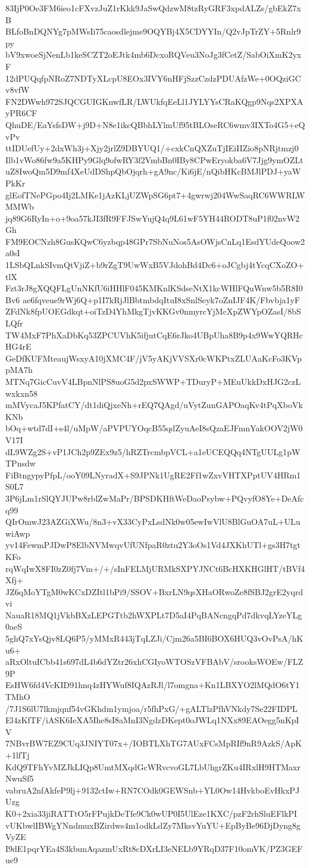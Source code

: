 83IjP0Oe3FM6ieo1cFXvzJuZ1rKkk9JaSwQdzwM8tzRyGRF3xpdALZs/gbEkZ7xB
BLfoBnDQNYg7pMWsIi75caosdlejme9OQYBj4X5CDYYIn/Q2vJpTrZY+5Rnlr9py
bV9xwoeSjNenLb1keSCZT2oEJtk4mb6DcxoRQVeu3NoJg3fCetZ/SabOiXmK2yxF
12dPUQqfpNRoZ7NDTyXLcpU8EOx3IVY6nHFjSzzCzdzPDUAfzWe+0OQziGCv8vfW
FN2DWwh972SJQCGUIGKnwfLR/LWUkfqEeLl1JYLYYsCRaKQgp9Nqs2XPXAyPR6CF
QhuDE/EaYsfsDW+j9D+N8e1ikcQBbhLYlmUf95tBLOseRC6wmv3IXTo4G5+eQvPv
ttIDUefUy+2dxWh3j+Xjy2jrlZ9DBYUQ1/+cxkCnQXZuTjIEiIIZio8pNRjtmzj0
Ilb1vWo86fw9a5KHPy9Glq9ofwRY3f2VmbBn0IBy8CPwEryokba6V7Jjg9ymOZLt
uZ8IwoQm5D9mf4XeUdDShpQbOjqrh+gA9nc/Ki6jE/nQibHKcBMJlPDJ+yaWPkKr
glEofTNePGpo4Ij2LMKe1jAzKLjUZWpSG6pt7+4gwrwj204WwSaqRC6WWRLWMMWb
jq89G6RyIn+o+9oa57kJI3fR9FFJSwYujQ4q9L61wF5YH44RODT8uP1f02nvW2Gh
FM9EOCNzh8GusKQwC6yzbqp48GPr7SbNuNos5AsOWjsCnLq1EsdYUdeQoow2a0sI
1LSbQLnkSIvmQtVjiZ+b9rZgT9UwWxB5VJdohBd4Dc6+oJCgbj4tYcqCXoZO+tlX
Fzt3rJ8gXQQFLgUnNKfU6iHHlF045KMKnlKSdseNtX1kcWHlFQuWnw5b5R8I0Bv6
ae6fqveue9rWj6Q+p1I7kRjJlBbtmbdqItuI8xSnlSeyk7oZnIJF4K/Fbvbja1yF
ZFdNk8fpUOEGdkqt+oiTzD4YhMkgTjvKKGv0nmyrcYjMcXpZWYpOZasI/8bSLQfr
TW4MxF7PhXaDbKq53ZPCUVhK5ifjutCqE6rJko4UBpUha8B9p4x9WwYQRHcHG4rE
GeDfKUFMteaujWsxyA10jXMC4F/jV5yAKjVVSXr0cWKPtxZLUAaKcFo3KVppMA7h
MTNq7GicCuvV4LBpnNlPS8uoG5d2pxSWWP+TDuryP+MEuUkkDxHJG2czLwxkxn58
mMVycaJ5KPfatCY/dt1diQjxeNh+rEQ7QAgd/uVytZunGAPOaqKv4tPqXboVkKNb
bOq+wtd7dI+s4l/uMpW/aPVPUYOqcB55qdZyuAeI8sQzaEJFmnYakOOV2jW0V17I
dL9WZg2S+vP1JCh2p9ZEx9z5/hRZTrcmbpVCL+a1eUCEQQq4NTgUULg1pWTPnsdw
FiBtngypyPfpL/ooY09LNyradX+S9JPNk1UgRE2Ff1wZxvVHTXPptUV4HRm1S0L7
3P6jLm1rSlQYJUPw8rblZwMaPr/BPSDKHftWeDaoPsybw+PQvyfO8Ye+DeAfcq99
QIrOmwJ23AZGiXWu/8n3+vX33CyPxLsdNk0w05ewIwVlU8BlGuOA7uL+ULuwiAwp
yv14FewmPJDwP8ElbNVMwqvUfUNfpaR0ztu2Y3oOs1Vd4JXKhUTl+gs3H7tgtKFo
rqWqIwX8FI0zZ0fj7Vm+/+/sInFELMjURMkSXPYJNCt6BcHXKHGlHT/tBVf4Xfj+
JZ6qMoYTgM0wKCxDZItl1bPi9/SSOV+BxrLN9qsXHaORwoZe8fSBJ2grE2yqrdvi
NauaR18MQ1jVkbBXzLEPGTtb2hWXPLt7D5aI4PqBANcngqPd7dkvqLYzeYLg0aeS
5ghQ7xYsQjv8LQ6P5/yMMxR443jTqLZJi/Cjm26a5BI6BOX6HUQ3vOvPsA/hKu6+
aRxOltuICbb41s697dL4b6dYZtr26xhCGIyoWTOSzVFBAbV/srooksWOEw/FLZ9P
EsHW6fd4VcKID91hnq4zHYWuf8IQAzRJl/l7omgna+Kn1LBXYO2lMQdO6tY1TMhO
/7J1S6lU7lkmjqnf54vGKhdm1ymjoa/r5fhPxG/+gALTlzPfhVNkdy7Se22FIDPL
El4zKfTF/iASK6IeXA5Ihe8sI8aMnI3NgdzDKept0oJWLq1NXx89EAOegg5nKpIV
7NBvrBW7EZ9CUq3JNIYT07x+/IOBTLXhTG7AUxFCsMpRIf9nR9AzkS/ApK+1lfTj
KdQ9TFhYvMZJkLIQp8UmtMXqdGcWRvcvoGL7LbUhgrZKu4IRxlH9HTMaxrNwuSf5
vabruA2nfAkfeP9lj+9132ctIw+RN7COdk0GEWSnb+YL0Ow14HvkboEvHkxPJUzg
K0+2xia33jiRATTtO5rFPujkDeTfe9Ck0wUP0I5UlEze1KXC/pzF2rhSluEFlkPI
vUKbwlIBWgYNndmuxBZirdws4m1odkLdZy7MksvYuYU+EpByBe96DjDyng8gVyZE
I9dE1pqrYEa4S3kbunAqazmUxRt8cDXrLI3eNELb9YRqD37F10omVK/PZ3GEFue9
